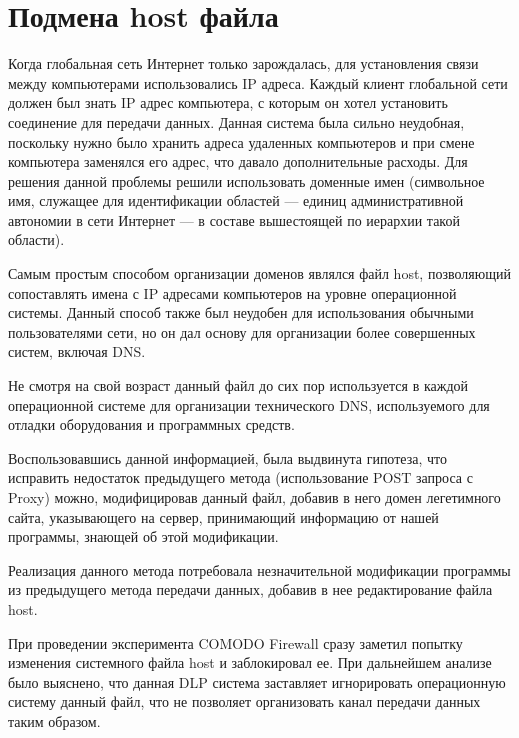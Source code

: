 \section{Подмена host файла}

Когда глобальная сеть Интернет только зарождалась, для установления связи между компьютерами использовались IP адреса. Каждый клиент глобальной сети должен был знать IP адрес компьютера, с которым он хотел установить соединение для передачи данных. Данная система была сильно неудобная, поскольку нужно было хранить адреса удаленных компьютеров и при смене компьютера заменялся его адрес, что давало дополнительные расходы. Для решения данной проблемы решили использовать доменные имен (символьное имя, служащее для идентификации областей — единиц административной автономии в сети Интернет — в составе вышестоящей по иерархии такой области). 

Самым простым способом организации доменов являлся файл host, позволяющий сопоставлять имена с IP адресами компьютеров на уровне операционной системы. Данный способ также был неудобен для использования обычными пользователями сети, но он дал основу для организации более совершенных систем, включая DNS. 

Не смотря на свой возраст данный файл до сих пор используется в каждой операционной системе для организации технического DNS, используемого для отладки оборудования и программных средств.

Воспользовавшись данной информацией, была выдвинута гипотеза, что исправить недостаток предыдущего метода (использование POST запроса с Proxy) можно, модифицировав данный файл, добавив в него домен легетимного сайта, указывающего на сервер, принимающий информацию от нашей программы, знающей об этой модификации.

Реализация данного метода потребовала незначительной модификации программы из предыдущего метода передачи данных, добавив в нее редактирование файла host. 

При проведении эксперимента COMODO Firewall сразу заметил попытку изменения системного файла host и заблокировал ее. При дальнейшем анализе было выяснено, что данная DLP система заставляет игнорировать операционную систему данный файл, что не позволяет организовать канал передачи данных таким образом.
